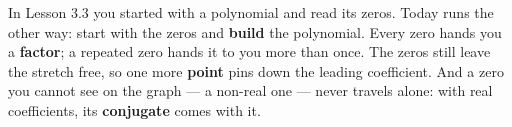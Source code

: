 \documentclass[10pt]{article}
\begin{document}
\vspace{0.14in}

\begin{remindbox}
\small
In Lesson 3.3 you started with a polynomial and read its zeros. Today runs the other way:
start with the zeros and \textbf{build} the polynomial. Every zero hands you a
\textbf{factor}; a repeated zero hands it to you more than once. The zeros still leave the
stretch free, so one more \textbf{point} pins down the leading coefficient. And a zero you
cannot see on the graph --- a non-real one --- never travels alone: with real coefficients,
its \textbf{conjugate} comes with it.
\end{remindbox}
\end{document}
